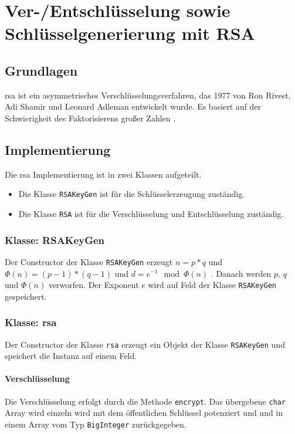 \chapter{Ver-/Entschlüsselung sowie Schlüsselgenerierung mit RSA}

\section{Grundlagen}
\gls{rsa} ist ein asymmetrisches Verschlüsselungsverfahren, das 1977 von Ron Rivest, Adi Shamir und Leonard Adleman entwickelt wurde. Es basiert auf der Schwierigkeit des Faktorisierens großer Zahlen \cite{rsaPaper}.

\section{Implementierung}
Die \gls{rsa} Implementierung ist in zwei Klassen aufgeteilt.
\begin{itemize}
	\item Die Klasse \texttt{RSAKeyGen} ist für die Schlüsselerzeugung zuständig.
	\item Die Klasse \texttt{RSA} ist für die Verschlüsselung und Entschlüsselung zuständig.
\end{itemize}

\subsection{Klasse: RSAKeyGen}
Der Constructor der Klasse \texttt{RSAKeyGen} erzeugt $n = p*q$ und $\Phi(n) = (p-1)*(q-1)$ und $d = e^{-1} \mod \Phi(n)$ \cite{rfc8017}. Danach werden $p$, $q$ und $\Phi(n)$ verworfen. Der Exponent $e$ wird auf Feld der Klasse \texttt{RSAKeyGen} gespeichert.

\subsection{Klasse: \gls{rsa}}
Der Constructor der Klasse \texttt{\gls{rsa}} erzeugt ein Objekt der Klasse \texttt{RSAKeyGen} und speichert die Instanz auf einem Feld.

\subsubsection{Verschlüsselung}
Die Verschlüsselung erfolgt durch die Methode \texttt{encrypt}. Das übergebene \texttt{char} Array wird einzeln wird mit dem öffentlichen Schlüssel potenziert \cite{rfc8017} und und in einem Array vom Typ \texttt{BigInteger} zurückgegeben.

